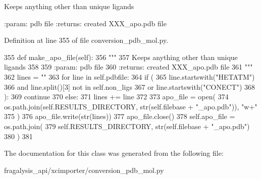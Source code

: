 \begin{DoxyVerb}Keeps anything other than unique ligands

:param: pdb file
:returns: created XXX_apo.pdb file
\end{DoxyVerb}
 

Definition at line 355 of file conversion\+\_\+pdb\+\_\+mol.\+py.


\begin{DoxyCode}
355     \textcolor{keyword}{def }make\_apo\_file(self):
356         \textcolor{stringliteral}{"""}
357 \textcolor{stringliteral}{        Keeps anything other than unique ligands}
358 \textcolor{stringliteral}{}
359 \textcolor{stringliteral}{        :param: pdb file}
360 \textcolor{stringliteral}{        :returns: created XXX\_apo.pdb file}
361 \textcolor{stringliteral}{        """}
362         lines = \textcolor{stringliteral}{""}
363         \textcolor{keywordflow}{for} line \textcolor{keywordflow}{in} self.pdbfile:
364             \textcolor{keywordflow}{if} (
365                 line.startswith(\textcolor{stringliteral}{"HETATM"})
366                 \textcolor{keywordflow}{and} line.split()[3] \textcolor{keywordflow}{not} \textcolor{keywordflow}{in} self.non\_ligs
367                 \textcolor{keywordflow}{or} line.startswith(\textcolor{stringliteral}{"CONECT"})
368             ):
369                 \textcolor{keywordflow}{continue}
370             \textcolor{keywordflow}{else}:
371                 lines += line
372 
373         apo\_file = open(
374             os.path.join(self.RESULTS\_DIRECTORY, str(self.filebase + \textcolor{stringliteral}{"\_apo.pdb"})), \textcolor{stringliteral}{"w+"}
375         )
376         apo\_file.write(str(lines))
377         apo\_file.close()
378         self.apo\_file = os.path.join(
379             self.RESULTS\_DIRECTORY, str(self.filebase + \textcolor{stringliteral}{"\_apo.pdb"})
380         )
381 
\end{DoxyCode}


The documentation for this class was generated from the following file\+:\begin{DoxyCompactItemize}
\item 
fragalysis\+\_\+api/xcimporter/conversion\+\_\+pdb\+\_\+mol.\+py\end{DoxyCompactItemize}
